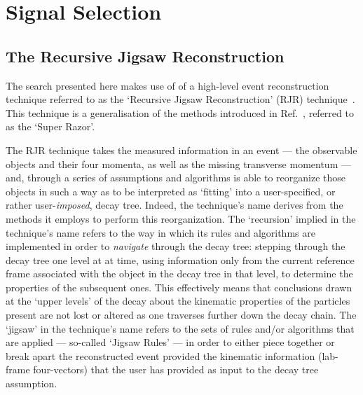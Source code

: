 \section{Signal Selection}
\label{sec:stop_strategy}

%
%
\subsection{The Recursive Jigsaw Reconstruction}
\label{sec:stop_rjr}

The \stopone search presented here makes use of of a high-level event reconstruction
technique referred to as the `Recursive Jigsaw Reconstruction' (RJR) technique~\cite{RecursiveJigsaw}.
This technique is a generalisation of the methods introduced in Ref.~\cite{SuperRazor}, referred
to as the `Super Razor'.

The RJR technique takes the measured information in an event --- the observable objects and their
four momenta, as well as the missing transverse momentum --- and, through a series of assumptions
and algorithms is able to reorganize those objects in such a way as to be interpreted as `fitting' into
a user-specified, or rather user-\textit{imposed}, decay tree.
Indeed, the technique's name derives from the methods it employs to perform this reorganization.
The `recursion' implied in the technique's name refers to the way in which its rules and algorithms
are implemented in order to \textit{navigate} through the decay tree: stepping through the decay
tree one level at at time, using information only from the current reference frame associated with
the object in the decay tree in that level, to determine the properties of the subsequent ones.
This effectively means that conclusions drawn at the `upper levels' of the decay about the kinematic
properties of the particles present are not lost or altered as one traverses further down the decay chain.
The `jigsaw' in the technique's name refers to the sets of rules and/or algorithms that are applied ---
so-called `Jigsaw Rules' --- in order to either piece together or break apart the reconstructed
event provided the kinematic information (lab-frame four-vectors) that the user has provided as input
to the decay tree assumption.

